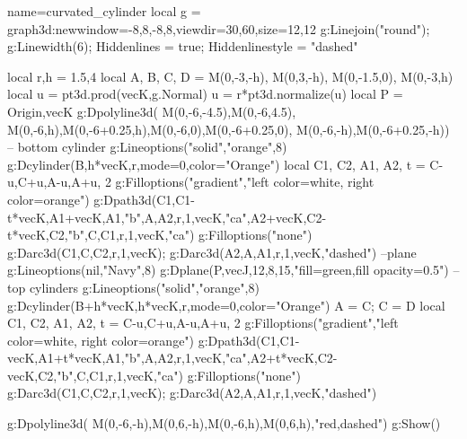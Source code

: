 \documentclass[12pt]{standalone}
\begin{document}
\begin{luadraw}{name=curvated_cylinder}
local g = graph3d:new{window={-8,8,-8,8},viewdir={30,60},size={12,12}}
g:Linejoin("round"); g:Linewidth(6); Hiddenlines = true; Hiddenlinestyle = "dashed"

local r,h = 1.5,4
local A, B, C, D = M(0,-3,-h), M(0,3,-h), M(0,-1.5,0), M(0,-3,h)
local u = pt3d.prod(vecK,g.Normal)
u = r*pt3d.normalize(u)
local P = {Origin,vecK}
g:Dpolyline3d({ {M(0,-6,-4.5),M(0,-6,4.5)}, {M(0,-6,h),M(0,-6+0.25,h)},{M(0,-6,0),M(0,-6+0.25,0)}, {M(0,-6,-h),M(0,-6+0.25,-h)}})
-- bottom cylinder
g:Lineoptions("solid","orange",8)
g:Dcylinder(B,h*vecK,r,{mode=0,color="Orange"})
local C1, C2, A1, A2, t = C-u,C+u,A-u,A+u, 2
g:Filloptions("gradient","left color=white, right color=orange")
g:Dpath3d({C1,C1-t*vecK,A1+vecK,A1,"b",A,A2,r,1,vecK,"ca",A2+vecK,C2-t*vecK,C2,"b",C,C1,r,1,vecK,"ca"})
g:Filloptions("none")
g:Darc3d(C1,C,C2,r,1,vecK); g:Darc3d(A2,A,A1,r,1,vecK,"dashed")
--plane
g:Lineoptions(nil,"Navy",8)
g:Dplane(P,vecJ,12,8,15,"fill=green,fill opacity=0.5")
-- top cylinders
g:Lineoptions("solid","orange",8)
g:Dcylinder(B+h*vecK,h*vecK,r,{mode=0,color="Orange"})
A = C; C = D
local C1, C2, A1, A2, t = C-u,C+u,A-u,A+u, 2
g:Filloptions("gradient","left color=white, right color=orange")
g:Dpath3d({C1,C1-vecK,A1+t*vecK,A1,"b",A,A2,r,1,vecK,"ca",A2+t*vecK,C2-vecK,C2,"b",C,C1,r,1,vecK,"ca"})
g:Filloptions("none")
g:Darc3d(C1,C,C2,r,1,vecK); g:Darc3d(A2,A,A1,r,1,vecK,"dashed")

g:Dpolyline3d( {{M(0,-6,-h),M(0,6,-h)},{M(0,-6,h),M(0,6,h)}},"red,dashed")
g:Show()
\end{luadraw}
\end{document}
